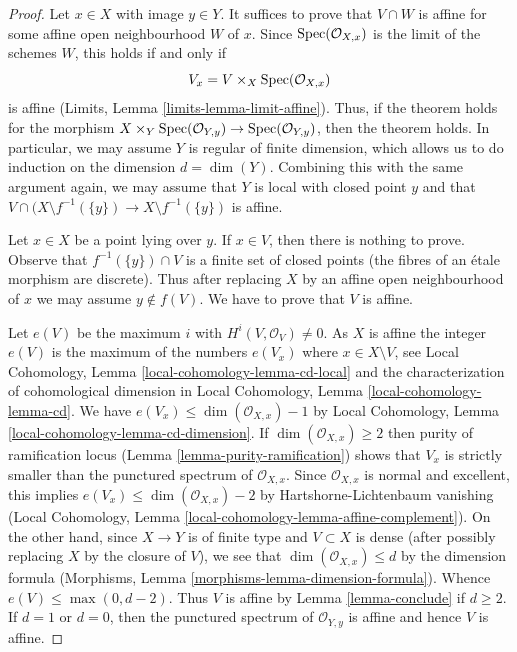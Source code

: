 \begin{proof}
Let $x \in X$ with image $y \in Y$. It suffices to prove that
$V \cap W$ is affine for some affine open neighbourhood $W$ of $x$.
Since $\mathop{\mathrm{Spec}}(\mathcal{O}_{X, x})$ is the limit of the schemes $W$,
this holds if and only if
$$
V_x = V \times_X \mathop{\mathrm{Spec}}(\mathcal{O}_{X, x})
$$
is affine (Limits, Lemma \ref{limits-lemma-limit-affine}).
Thus, if the theorem holds for the morphism
$X \times_Y \mathop{\mathrm{Spec}}(\mathcal{O}_{Y, y}) \to \mathop{\mathrm{Spec}}(\mathcal{O}_{Y, y})$,
then the theorem holds. In particular, we may assume $Y$
is regular of finite dimension, which allows us to do induction
on the dimension $d = \dim(Y)$. Combining this with the same argument again,
we may assume that $Y$ is local with closed point $y$ and that
$V \cap (X \setminus f^{-1}(\{y\}) \to X \setminus f^{-1}(\{y\})$
is affine.

\medskip\noindent
Let $x \in X$ be a point lying over $y$. If $x \in V$, then
there is nothing to prove. Observe that  $f^{-1}(\{y\}) \cap V$
is a finite set of closed points (the fibres of an \'etale morphism
are discrete). Thus after replacing $X$
by an affine open neighbourhood of $x$ we may assume
$y \not \in f(V)$. We have to prove that $V$ is affine.

\medskip\noindent
Let $e(V)$ be the maximum $i$ with $H^i(V, \mathcal{O}_V) \not = 0$.
As $X$ is affine the integer $e(V)$ is the maximum of the numbers $e(V_x)$
where $x \in X \setminus V$, see
Local Cohomology, Lemma \ref{local-cohomology-lemma-cd-local}
and the characterization of cohomological dimension
in Local Cohomology, Lemma \ref{local-cohomology-lemma-cd}.
We have $e(V_x) \leq \dim(\mathcal{O}_{X, x}) - 1$ by
Local Cohomology, Lemma \ref{local-cohomology-lemma-cd-dimension}.
If $\dim(\mathcal{O}_{X, x}) \geq 2$ then purity of
ramification locus (Lemma \ref{lemma-purity-ramification})
shows that $V_x$ is strictly smaller than the punctured spectrum of
$\mathcal{O}_{X, x}$. Since $\mathcal{O}_{X, x}$ is
normal and excellent, this implies
$e(V_x) \leq \dim(\mathcal{O}_{X, x}) - 2$ by
Hartshorne-Lichtenbaum vanishing
(Local Cohomology, Lemma \ref{local-cohomology-lemma-affine-complement}).
On the other hand, since $X \to Y$ is of finite type
and $V \subset X$ is dense (after possibly replacing $X$
by the closure of $V$), we see that $\dim(\mathcal{O}_{X, x}) \leq d$
by the dimension formula
(Morphisms, Lemma \ref{morphisms-lemma-dimension-formula}).
Whence $e(V) \leq \max(0, d -  2)$.
Thus $V$ is affine by Lemma \ref{lemma-conclude}
if $d \geq 2$. If $d = 1$ or $d = 0$, then the punctured spectrum of
$\mathcal{O}_{Y, y}$ is affine and hence $V$ is affine.
\end{proof}




